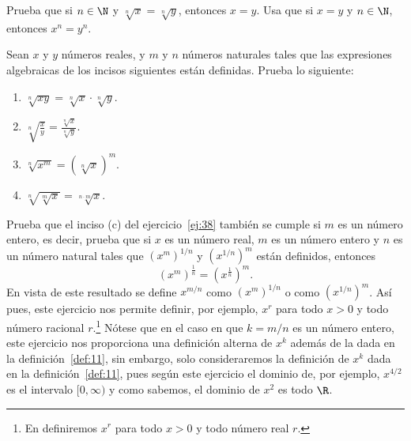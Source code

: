 \documentclass[12pt,a4paper]{book}
\begin{document}
    \begin{ejercicio}\label{ej:37}
        Prueba que
        si $n\in\N$ y $\sqrt[n]{x}=\sqrt[n]{y}$, entonces $x=y$. \sugerencia Usa que si $x=y$ y
        $n\in\N$, entonces $x^{n}=y^{n}$.
    \end{ejercicio}

    \begin{ejercicio}\label{ej:38}
        Sean $x$ y $y$ números reales, y $m$
        y $n$ números naturales tales que las expresiones algebraicas de los incisos
        siguientes están definidas. Prueba lo siguiente:
        \begin{enumerate}[nosep]
            \item $\sqrt[n]{xy}=\sqrt[n]{x}\cdot\sqrt[n]{y}$.
            \item $\sqrt[n]{\frac{x}{y}}=\frac{\sqrt[n]{x}}{\sqrt[n]{y}}$.
            \item $\sqrt[n]{x^{m}}=(\sqrt[n]{x})^{m}$.
            \item $\sqrt[n]{\sqrt[m]{x}}=\sqrt[n\cdot m]{x}$.
        \end{enumerate}
    \end{ejercicio}

    \begin{ejercicio}\label{ej:39}
        Prueba que el inciso (c) del ejercicio~\ref{ej:38}
        también se cumple si $m$ es un número entero, es decir, prueba que si $x$ es
        un número real, $m$ es un número entero y $n$ es un número natural tales que
        $(x^{m})^{1/n}$ y $(x^{1/n})^{m}$ están definidos, entonces
        \begin{equation*}
            (x^{m})^{\frac{1}{n}}=\left(x^{\frac{1}{n}}\right)^{m}.
        \end{equation*}
        En vista de este resultado se define $x^{m/n}$ como $(x^{m})^{1/n}$ o como $(x^{1/n})^{m}$. Así
        pues, este ejercicio nos permite definir, por ejemplo, $x^{r}$ para todo $x>0$ y
        todo número racional $r$.\footnote{En \cite{nunez2020calculoII} definiremos $x^{r}$ para todo $x>0$ y todo número real $r$.} Nótese que en el caso en que $k=m/n$ es un número
        entero, este ejercicio nos proporciona una definición alterna de $x^{k}$ además de
        la dada en la definición~\ref{def:11}, sin embargo, solo consideraremos la definición
        de $x^{k}$ dada en la definición~\ref{def:11}, pues según este ejercicio el dominio de, por
        ejemplo, $x^{4/2}$ es el intervalo $[0,\infty)$ y como sabemos, el dominio de $x^{2}$ es todo
        $\R$.
    \end{ejercicio}
\end{document}

